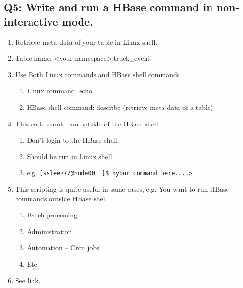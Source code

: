 \documentclass[]{article}
\begin{document}
\subsection*{Q5: Write and run a HBase command in non-interactive mode.} 
\begin{enumerate}[before=\itshape,font=\normalfont,label=(\alph*)]
	\item Retrieve meta-data of your table in Linux shell.
	\item Table name: <your-namespace>:truck\_event
	\item Use Both Linux commands and HBase shell commands
	\begin{enumerate}[label=(\roman*)]
		\item Linux command: echo
		\item HBase shell command: describe (retrieve meta-data of a table)
	\end{enumerate}
	\item This code should run outside of the HBase shell.
	\begin{enumerate}[label=(\roman*)]
		\item Don’t login to the HBase shell.
		\item Should be run in Linux shell
		\item e.g. \texttt{[sslee777@node00 ~]\$ <your command here....>}
	\end{enumerate}
	\item This scripting is quite useful in some cases, e.g. You want to run HBase commands outside HBase shell. 
	\begin{enumerate}[label=(\roman*)]
		\item Batch processing
		\item Administration
		\item Automation – Cron jobs
		\item Etc.
	\end{enumerate}
	\item See \href{https://hbase.apache.org/book.html#_running_the_shell_in_non_interactive_mode
		and https://hbase.apache.org/book.html#hbase.shell.noninteractive}{link.}
\end{enumerate}
\end{document}
